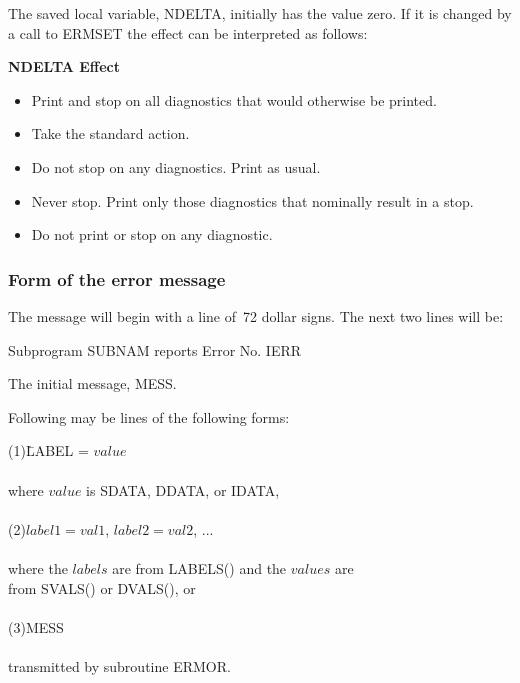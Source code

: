 \documentclass[twoside]{MATH77}
\begin{document}
The saved local variable, NDELTA, initially has the value zero. If it is
changed by a call to ERMSET the effect can be interpreted as follows:

{\bf NDELTA \hspace{.75in} Effect}\vspace{-3pt}
\begin{itemize}
\item[2\ ]  Print and stop on all diagnostics that would otherwise be printed.

\item[0\ ]  Take the standard action.

\item[$-$1\ ]  Do not stop on any diagnostics. Print as usual.

\item[$-$2\ ]  Never stop. Print only those diagnostics that nominally result in a stop.

\item[$-$4\ ]  Do not print or stop on any diagnostic.
\end{itemize}

\subsubsection{Form of the error message}

The message will begin with a line of~72 dollar signs. The next two lines
will be:

Subprogram SUBNAM reports Error No. IERR

The initial message, MESS.

Following may be lines of the following forms:

\begin{tabbing}
(1)\hspace{.2in}\=LABEL = $value$\\
\\
where $value$ is SDATA, DDATA, or IDATA,\\
\\
(2)\>$label1 = val1$, $label2 = val2$, ...\\
\\
where the $labels$ are from LABELS() and the $values$ are\\
from SVALS() or DVALS(), or\\
\\
(3)\>MESS\\
\\
transmitted by subroutine ERMOR.
\end{tabbing}
\end{document}
